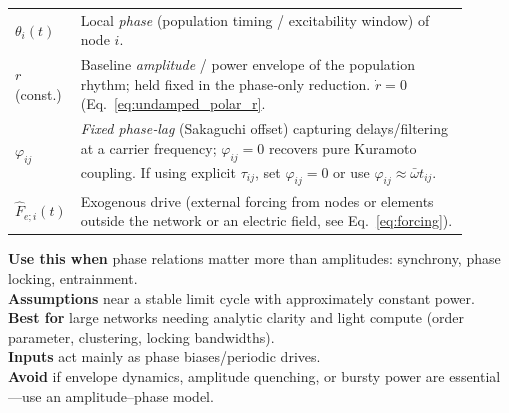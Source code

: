\documentclass[12pt]{article}
\numberwithin{equation}{section}
\begin{document}
\begin{tcolorbox}
\begin{tabular}{@{}l p{0.9\linewidth}@{}}
\textbf{$\theta_i(t)$} & Local \emph{phase} (population timing / excitability window) of node $i$.\\
\textbf{$r$}(const.) & Baseline \emph{amplitude} / power envelope of the population rhythm; held fixed in the phase‑only reduction. $\dot r=0$ (Eq.~\ref{eq:undamped_polar_r}.\\
\textbf{$\varphi_{ij}$} & \emph{Fixed phase‑lag} (Sakaguchi offset) capturing delays/filtering at a carrier frequency; $\varphi_{ij}=0$ recovers pure Kuramoto coupling. If using explicit $\tau_{ij}$, set $\varphi_{ij}{=}0$ or use $\varphi_{ij}\approx\bar\omega t_{ij}$.\\
\textbf{$\hat F_{e;i}(t)$}& Exogenous drive  (external forcing from nodes or elements outside the network or an electric field, see Eq.~\ref{eq:forcing}). 


\end{tabular}
\end{tcolorbox}

\begin{tcolorbox}[
  colback=gray!5,
  colframe=slate,
  colbacktitle=softblue!25,
  coltitle=softblue!60!black,
  fonttitle=\bfseries\small,
  title={\small When to Use It},
  boxrule=0.4pt,
  enhanced, sharp corners,
  left=4pt,right=4pt,top=3pt,bottom=3pt,
  boxsep=2pt,
  before skip=6pt, after skip=6pt
]
\scriptsize
\textbf{Use this when} phase relations matter more than amplitudes: synchrony, phase locking, entrainment.\\
\textbf{Assumptions} near a stable limit cycle with approximately constant power.\\
\textbf{Best for} large networks needing analytic clarity and light compute (order parameter, clustering, locking bandwidths).\\
\textbf{Inputs} act mainly as phase biases/periodic drives.\\
\textbf{Avoid} if envelope dynamics, amplitude quenching, or bursty power are essential—use an amplitude–phase model.
\end{tcolorbox}
\end{document}
